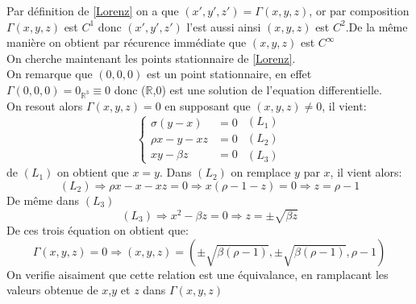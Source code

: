 \documentclass{article}
\newcommand{\R}{\mathbb{R}}
\begin{document}
Par définition de \eqref{Lorenz} on a que $(x',y',z') = \Gamma(x,y,z)$, or par composition $\Gamma(x,y,z)$ est $C^1$ donc $(x',y',z')$ l'est aussi ainsi $(x,y,z)$ est $C^2$.De la même manière on obtient par récurence immédiate que $(x,y,z)$ est $C^\infty$\\
On cherche maintenant les points stationnaire de \eqref{Lorenz}.\\
On remarque que $(0,0,0)$ est un point stationnaire, en effet $\Gamma(0,0,0) = 0_{\R^3} \equiv 0$ donc ($\R$,0) est une solution de l'equation differentielle.\\
On resout alors $\Gamma(x,y,z)=0$ en supposant que $(x,y,z) \neq 0$, il vient:
\[
\left\{\begin{array}{rl} %
     \sigma(y-x)&=0  \\
     \rho x -y -xz&=0\\
     xy - \beta z&=0
\end{array}\right.
\begin{array}{c} %
    (L_1)\\
    (L_2)\\
    (L_3)
\end{array}
\]
de $(L_1)$ on obtient que $x=y$. Dans $(L_2)$ on remplace $y$ par $x$, il vient alors:
\[
    (L_2) \Rightarrow \rho x - x - xz = 0 \Rightarrow x (\rho -1 -z ) = 0 \Rightarrow z = \rho -1
\]
De m\^eme dans $(L_3)$
\[
    (L_3) \Rightarrow x^2 - \beta z = 0 \Rightarrow z = \pm \sqrt{\beta z}
\]
De ces trois équation on obtient que:\[
    \Gamma(x,y,z)=0 \Rightarrow (x,y,z) = (\pm \sqrt{ \beta (\rho -1)} ,\pm \sqrt{\beta (\rho -1)}, \rho -1)   
\]
On verifie aisaiment que cette relation est une \'equivalance, en ramplacant les valeurs obtenue de $x$,$y$ et $z$ dans $\Gamma(x,y,z)$
\end{document}
